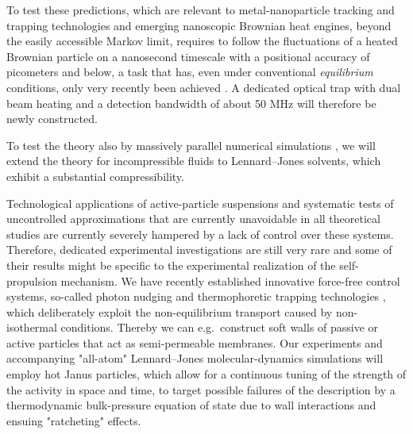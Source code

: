\begin{workpackage}
\begin{tasklist}
\begin{task}[title=Noise Temperature,id=task3,lead=Leipzig,wphases=0-24!0.5]
To test these predictions, which are relevant to metal-nanoparticle tracking and trapping technologies and emerging
nanoscopic Brownian heat engines, beyond the easily accessible Markov limit, requires to follow the fluctuations of 
a heated Brownian particle on a nanosecond timescale with a positional accuracy of picometers and below, a task 
that has, even under conventional \emph{equilibrium} conditions, only very recently been achieved \cite{kheifets-etal:2014}.
%
A dedicated optical trap with dual beam heating and a detection bandwidth of about 50 MHz
will therefore be newly constructed.

To test the theory also by massively parallel numerical simulations \cite{chakraborty-etal:2011}, 
we will extend the theory for incompressible fluids 
to Lennard--Jones solvents, which exhibit a substantial compressibility.
\end{task}

\begin{task}[title=Active-Particle Suspensions,id=task4,lead=Leipzig,wphases=24-48!0.5]
Technological applications of active-particle suspensions and systematic tests of
uncontrolled approximations that are currently unavoidable in all theoretical studies are
currently severely hampered by a lack of control over these systems.
%
Therefore, dedicated experimental investigations are still very rare and some of their
results might be specific to the experimental realization of the self-propulsion mechanism.
%
We have recently established innovative force-free control systems, so-called photon nudging
and thermophoretic trapping technologies \cite{Qian2013,Braun:NanoLetters:2015}, which deliberately exploit 
the non-equilibrium transport caused by non-isothermal conditions.
%
Thereby we can e.g.\ construct soft walls of passive or active particles that act as
semi-permeable membranes.
%
Our experiments and accompanying "all-atom" Lennard--Jones molecular-dynamics simulations \cite{chakraborty-etal:2011} 
will employ hot Janus particles, which allow for a continuous tuning of the strength of 
the activity in space and time, to target 
possible failures of the description by a thermodynamic bulk-pressure equation of
state \cite{ginot-etal:2015} due to wall interactions and ensuing "ratcheting" effects.
\end{task}


\end{tasklist}

\printbibliography[heading=proposal-bib,env=proposal-env]


\end{workpackage}

